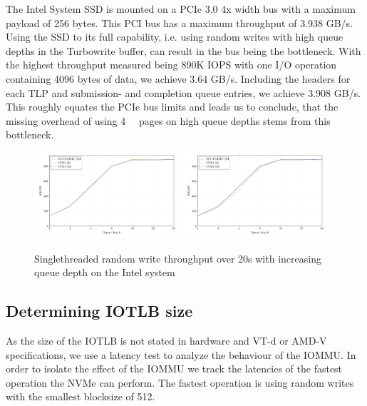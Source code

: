 The Intel System SSD is mounted on a PCIe 3.0 4x width bus with a maximum payload of 256 bytes. This PCI bus has a maximum throughput of 3.938 GB/s. Using the SSD to its full capability, i.e. using random writes with high queue depths in the Turbowrite buffer, can result in the bus being the bottleneck. With the highest throughput measured being 890K IOPS with one I/O operation containing 4096 bytes of data, we achieve 3.64 GB/s. Including the headers for each TLP and submission- and completion queue entries, we achieve 3.908 GB/s. This roughly equates the PCIe bus limits and leads us to conclude, that the missing overhead of using \qty{4}{\kibi\byte} pages on high queue depths stems from this bottleneck.

\begin{figure}[H]
  \centering
   {\includegraphics[width=0.48\textwidth]{figures/qdnt1_1page}}
   {\includegraphics[width=0.48\textwidth]{figures/qdnt1_512page}}
  \caption{Singlethreaded random write throughput over 20s with increasing queue depth on the Intel system}
  \label{fig:qdnt1-4kib}
\end{figure}

\subsection{Determining IOTLB size}
As the size of the IOTLB is not stated in hardware and VT-d or AMD-V specifications, we use a latency test to analyze the behaviour of the IOMMU.
In order to isolate the effect of the IOMMU we track the latencies of the fastest operation the NVMe can perform. The fastest operation is using random writes with the smallest blocksize of \qty{512}{\byte}.

